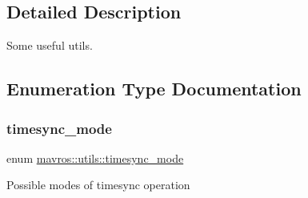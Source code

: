 \subsection{Detailed Description}
Some useful utils. 



\subsection{Enumeration Type Documentation}
\mbox{\label{group__mavutils_gac7f53712a7627f397d0eb145c2a16cf7}} 
\subsubsection{\texorpdfstring{timesync\_mode}{timesync\_mode}}
{\footnotesize\ttfamily enum \mbox{\hyperlink{group__mavutils_gac7f53712a7627f397d0eb145c2a16cf7}{mavros\+::utils\+::timesync\+\_\+mode}}\hspace{0.3cm}{\ttfamily [strong]}}

Possible modes of timesync operation

